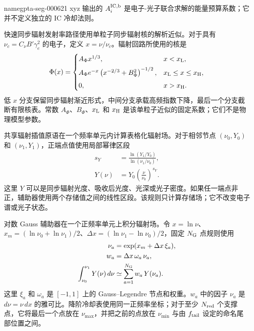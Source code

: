 \documentclass[twocolumn]{aastex702}
\makeatletter
\providecommand{\gptareaderanchor}[1]{\pdfdest name{#1} xyz}%
\providecommand{\gptareaderanchor}[1]{\special{pdf:dest (#1) [ @thispage /XYZ @xpos @ypos null ]}}%
\makeatother
\begin{document}
\gptareaderanchor{gpta-seg-000621}%
输出的 \(A_i^{\rm IC,b}\) 是电子-光子联合求解的能量预算系数；它并不定义独立的 IC 冷却法则。

快速同步辐射发射率路径使用单粒子同步辐射核的解析近似。对于具有 \(\nu_c=C_\nu B'\gamma_e^2\) 的电子，定义 \(x=\nu/\nu_c\)。辐射回路所使用的核是
\begin{equation}
\Phi(x)=
\begin{cases}
A_\Phi x^{1/3}, & x<x_{\rm L},\\[1ex]
A_\Phi e^{-x}\left(x^{-2/3}+B_\Phi^2\right)^{-1/2},
& x_{\rm L}\le x\le x_{\rm H},\\[1ex]
0, & x>x_{\rm H}.
\end{cases}
\end{equation}
低 \(x\) 分支保留同步辐射渐近形式，中间分支承载高频指数下降，最后一个分支截断有限核表。常数 \(A_\Phi\)、\(B_\Phi\)、\(x_{\rm L}\) 和 \(x_{\rm H}\) 是该单粒子近似的固定系数；它们不是物理模型参数。

共享辐射插值原语在一个频率单元内计算表格化辐射场。对于相邻节点 \((\nu_0,Y_0)\) 和 \((\nu_1,Y_1)\)，正端点值使用局部幂律区段
\begin{equation}
\begin{aligned}
s_Y&=\frac{\ln(Y_1/Y_0)}{\ln(\nu_1/\nu_0)},\\
Y(\nu)&=Y_0\left(\frac{\nu}{\nu_0}\right)^{s_Y}.
\end{aligned}
\end{equation}
这里 \(Y\) 可以是同步辐射光度、吸收后光度、光深或光子密度。如果任一端点非正，辅助器使用两个存储值之间的线性区段。该规则只计算存储场；它不改变电子谱或光子状态。

对数 Gauss 辅助器在一个正频率单元上积分辐射场。令 \(x=\ln\nu\)、\(x_m=(\ln\nu_0+\ln\nu_1)/2\)、\(\Delta x=(\ln\nu_1-\ln\nu_0)/2\)，固定 \(N_{\rm G}\) 点规则使用
\begin{equation}
\begin{aligned}
\nu_a&=\exp(x_m+\Delta x\,\xi_a),\\
w_a&=\Delta x\,\omega_a\,\nu_a,\\
\int_{\nu_0}^{\nu_1}Y(\nu)\,d\nu
&\simeq \sum_{a=1}^{N_{\rm G}} w_a\,Y(\nu_a).
\end{aligned}
\end{equation}
这里 \(\xi_a\) 和 \(\omega_a\) 是 \([-1,1]\) 上的 Gauss--Legendre 节点和权重。\(w_a\) 中的因子 \(\nu_a\) 是 \(d\nu=\nu\,dx\) 的雅可比。降阶冷却表使用同一正频率坐标；对于至少 \(N_{\rm red}\) 个支撑点，它将最后一个点放在 \(\nu_{\max}\)，并把之前的点放在 \(\nu_{\min}\) 与由 \(f_{\rm tail}\) 设定的命名尾部位置之间。
\end{document}
